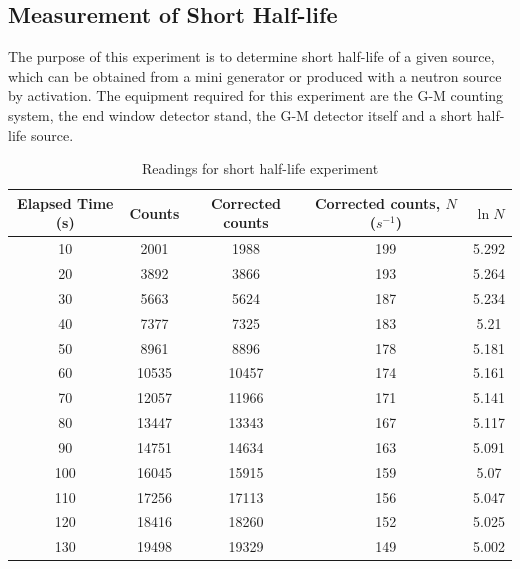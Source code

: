 \documentclass[%
 reprint,
nofootinbib,
 amsmath,amssymb,
 aps,
floatfix,
]{revtex4-2}
\begin{document}
    \subsection{Measurement of Short Half-life}
        The purpose of this experiment is to determine short half-life of a given source, which can be obtained from a mini generator or produced with a neutron source by activation. The equipment required for this experiment are the G-M counting system, the end window detector stand, the G-M detector itself and a short half-life source.
        \begin{table}[]
        \caption{Readings for short half-life experiment}
        \label{tab:half-life}
        \setlength{\tabcolsep}{15pt}
        \begin{tabular}{@{}ccccc@{}}
        \toprule
        \textbf{Elapsed   Time} (s) & \textbf{Counts} & \textbf{Corrected counts} & \textbf{Corrected counts}, $N$ ($s^{-1}$) & $\ln N$  \\ \midrule
        10               & 2001   & 1988             & 199                      & 5.292 \\
        20               & 3892   & 3866             & 193                      & 5.264 \\
        30               & 5663   & 5624             & 187                      & 5.234 \\
        40               & 7377   & 7325             & 183                      & 5.21  \\
        50               & 8961   & 8896             & 178                      & 5.181 \\
        60               & 10535  & 10457            & 174                      & 5.161 \\
        70               & 12057  & 11966            & 171                      & 5.141 \\
        80               & 13447  & 13343            & 167                      & 5.117 \\
        90               & 14751  & 14634            & 163                      & 5.091 \\
        100              & 16045  & 15915            & 159                      & 5.07  \\
        110              & 17256  & 17113            & 156                      & 5.047 \\
        120              & 18416  & 18260            & 152                      & 5.025 \\
        130              & 19498  & 19329            & 149                      & 5.002 \\

\end{tabular}
\end{table}
\end{document}
